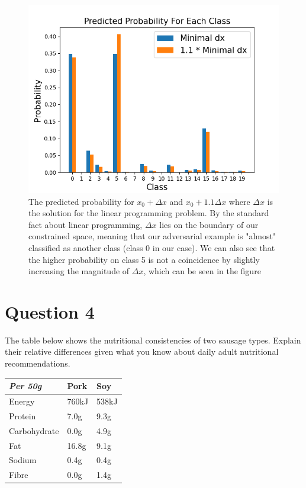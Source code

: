 \documentclass[
	12pt, %
]{../Template/fphw}
\begin{document}
\begin{enumerate}[label = (\arabic*)]
    \begin{figure}[!htbp]
        \centering
        \includegraphics[width=\linewidth]{HW1/q4-5.png}
        \caption{The predicted probability for $x_0+\Delta x$ and $x_0+1.1\Delta x$ where $\Delta x$ is the solution for the linear programming problem. By the standard fact about linear programming, $\Delta x$ lies on the boundary of our constrained space, meaning that our adversarial example is "almost" classified as another class (class 0 in our case). We can also see that the higher probability on class 5 is not a coincidence by slightly increasing the magnitude of $\Delta x$, which can be seen in the figure}
        \label{fig:q4-5}
    \end{figure}
\end{enumerate}


\section*{Question 4 }

\begin{problem}
	The table below shows the nutritional consistencies of two sausage types. Explain their relative differences given what you know about daily adult nutritional recommendations.
	
	\bigskip
    
	\begin{center}
		\begin{tabular}{l l l}
			\toprule
			\textit{Per 50g} & Pork & Soy \\
			\midrule
			Energy & 760kJ & 538kJ\\
			Protein & 7.0g & 9.3g\\
			Carbohydrate & 0.0g & 4.9g\\
			Fat & 16.8g & 9.1g\\
			Sodium & 0.4g & 0.4g\\
			Fibre & 0.0g & 1.4g\\
			\bottomrule
		\end{tabular}
	\end{center}
	
	\medskip
\end{problem}
\end{document}
